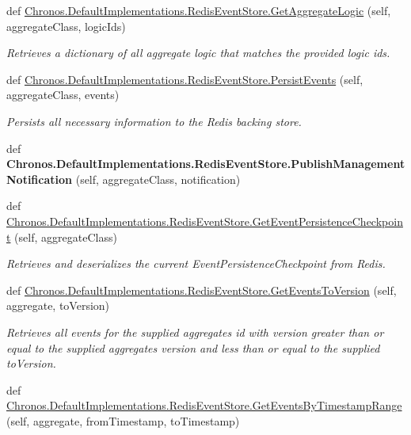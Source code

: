 \begin{DoxyCompactItemize}
\item 
def \hyperlink{group__Chronos_ga99132bff35045acd67ea8d9bbc5f32c8}{Chronos.\+Default\+Implementations.\+Redis\+Event\+Store.\+Get\+Aggregate\+Logic} (self, aggregate\+Class, logic\+Ids)
\begin{DoxyCompactList}\small\item\em Retrieves a dictionary of all aggregate logic that matches the provided logic ids. \end{DoxyCompactList}\item 
def \hyperlink{group__Chronos_gaa6e3ef31e155461d4739f78f557289dc}{Chronos.\+Default\+Implementations.\+Redis\+Event\+Store.\+Persist\+Events} (self, aggregate\+Class, events)
\begin{DoxyCompactList}\small\item\em Persists all necessary information to the Redis backing store. \end{DoxyCompactList}\item 
def {\bfseries Chronos.\+Default\+Implementations.\+Redis\+Event\+Store.\+Publish\+Management\+Notification} (self, aggregate\+Class, notification)\hypertarget{group__Chronos_ga016f72dace5cbe35b4a7be2fb7a3c956}{}\label{group__Chronos_ga016f72dace5cbe35b4a7be2fb7a3c956}

\item 
def \hyperlink{group__Chronos_gac49283b5aa4ff3905743e32a22a4d603}{Chronos.\+Default\+Implementations.\+Redis\+Event\+Store.\+Get\+Event\+Persistence\+Checkpoint} (self, aggregate\+Class)
\begin{DoxyCompactList}\small\item\em Retrieves and deserializes the current Event\+Persistence\+Checkpoint from Redis. \end{DoxyCompactList}\item 
def \hyperlink{group__Chronos_ga800945f4d3c67903a35524bebd8041e6}{Chronos.\+Default\+Implementations.\+Redis\+Event\+Store.\+Get\+Events\+To\+Version} (self, aggregate, to\+Version)
\begin{DoxyCompactList}\small\item\em Retrieves all events for the supplied aggregate\textquotesingle{}s id with version greater than or equal to the supplied aggregate\textquotesingle{}s version and less than or equal to the supplied to\+Version. \end{DoxyCompactList}\item 
def \hyperlink{group__Chronos_gac6fb1dcb8045a9c9aeb5716f78dbff89}{Chronos.\+Default\+Implementations.\+Redis\+Event\+Store.\+Get\+Events\+By\+Timestamp\+Range} (self, aggregate, from\+Timestamp, to\+Timestamp)\hypertarget{group__Chronos_gac6fb1dcb8045a9c9aeb5716f78dbff89}{}\label{group__Chronos_gac6fb1dcb8045a9c9aeb5716f78dbff89}


\end{DoxyCompactItemize}

